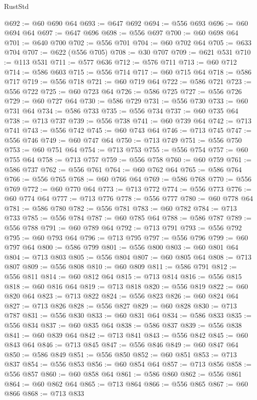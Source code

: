 \begin{lexlean}{RustStd}
\begin{coremodule}
@692 := @60 @690 @64
@693 := @647 @692
@694 := @556 @693
@696 := @60 @694 @64
@697 := @647 @696
@698 := @556 @697
@700 := @60 @698 @64
@701 := @640 @700
@702 := @556 @701
@704 := @60 @702 @64
@705 := @633 @704
@707 := @622 (@556 @705)
@708 := @30 @707
@709 := @621 @531
@710 := @113 @531
@711 := @577 @636
@712 := @576 @711
@713 := @60 @712
@714 := @586 @603
@715 := @556 @714
@717 := @60 @715 @64
@718 := @586 @717
@719 := @556 @718
@721 := @60 @719 @64
@722 := @586 @721
@723 := @556 @722
@725 := @60 @723 @64
@726 := @586 @725
@727 := @556 @726
@729 := @60 @727 @64
@730 := @586 @729
@731 := @556 @730
@733 := @60 @731 @64
@734 := @586 @733
@735 := @556 @734
@737 := @60 @735 @64
@738 := @713 @737
@739 := @556 @738
@741 := @60 @739 @64
@742 := @713 @741
@743 := @556 @742
@745 := @60 @743 @64
@746 := @713 @745
@747 := @556 @746
@749 := @60 @747 @64
@750 := @713 @749
@751 := @556 @750
@753 := @60 @751 @64
@754 := @713 @753
@755 := @556 @754
@757 := @60 @755 @64
@758 := @713 @757
@759 := @556 @758
@760 := @60 @759
@761 := @586 @737
@762 := @556 @761
@764 := @60 @762 @64
@765 := @586 @764
@766 := @556 @765
@768 := @60 @766 @64
@769 := @586 @768
@770 := @556 @769
@772 := @60 @770 @64
@773 := @713 @772
@774 := @556 @773
@776 := @60 @774 @64
@777 := @713 @776
@778 := @556 @777
@780 := @60 @778 @64
@781 := @586 @780
@782 := @556 @781
@783 := @60 @782
@784 := @713 @733
@785 := @556 @784
@787 := @60 @785 @64
@788 := @586 @787
@789 := @556 @788
@791 := @60 @789 @64
@792 := @713 @791
@793 := @556 @792
@795 := @60 @793 @64
@796 := @713 @795
@797 := @556 @796
@799 := @60 @797 @64
@800 := @586 @799
@801 := @556 @800
@803 := @60 @801 @64
@804 := @713 @803
@805 := @556 @804
@807 := @60 @805 @64
@808 := @713 @807
@809 := @556 @808
@810 := @60 @809
@811 := @586 @791
@812 := @556 @811
@814 := @60 @812 @64
@815 := @713 @814
@816 := @556 @815
@818 := @60 @816 @64
@819 := @713 @818
@820 := @556 @819
@822 := @60 @820 @64
@823 := @713 @822
@824 := @556 @823
@826 := @60 @824 @64
@827 := @713 @826
@828 := @556 @827
@829 := @60 @828
@830 := @713 @787
@831 := @556 @830
@833 := @60 @831 @64
@834 := @586 @833
@835 := @556 @834
@837 := @60 @835 @64
@838 := @586 @837
@839 := @556 @838
@841 := @60 @839 @64
@842 := @713 @841
@843 := @556 @842
@845 := @60 @843 @64
@846 := @713 @845
@847 := @556 @846
@849 := @60 @847 @64
@850 := @586 @849
@851 := @556 @850
@852 := @60 @851
@853 := @713 @837
@854 := @556 @853
@856 := @60 @854 @64
@857 := @713 @856
@858 := @556 @857
@860 := @60 @858 @64
@861 := @586 @860
@862 := @556 @861
@864 := @60 @862 @64
@865 := @713 @864
@866 := @556 @865
@867 := @60 @866
@868 := @713 @833

\end{coremodule}
\end{lexlean}
